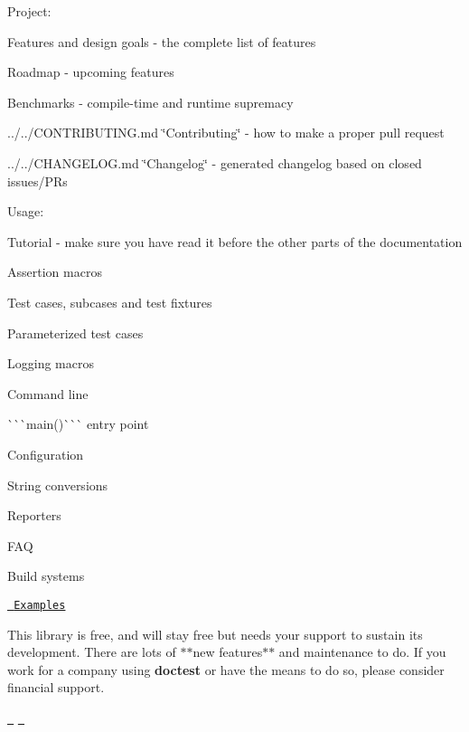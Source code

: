 Project\+:


\begin{DoxyItemize}
\item Features and design goals -\/ the complete list of features
\item Roadmap -\/ upcoming features
\item Benchmarks -\/ compile-\/time and runtime supremacy
\item ../../\+C\+O\+N\+T\+R\+I\+B\+U\+T\+I\+NG.md \char`\"{}\+Contributing\char`\"{} -\/ how to make a proper pull request
\item ../../\+C\+H\+A\+N\+G\+E\+L\+OG.md \char`\"{}\+Changelog\char`\"{} -\/ generated changelog based on closed issues/\+P\+Rs
\end{DoxyItemize}

Usage\+:


\begin{DoxyItemize}
\item Tutorial -\/ make sure you have read it before the other parts of the documentation
\item Assertion macros
\item Test cases, subcases and test fixtures
\item Parameterized test cases
\item Logging macros
\item Command line
\item \`{}\`{}\`{}main()\`{}\`{}\`{} entry point
\item Configuration
\item String conversions
\item Reporters
\item F\+AQ
\item Build systems
\item \href{../../examples}{\texttt{ Examples}}
\end{DoxyItemize}

This library is free, and will stay free but needs your support to sustain its development. There are lots of $\ast$$\ast$new features$\ast$$\ast$ and maintenance to do. If you work for a company using {\bfseries{doctest}} or have the means to do so, please consider financial support.

\href{http://www.patreon.com/onqtam}{\texttt{ }} \href{https://www.paypal.me/onqtam/10}{\texttt{ }}





